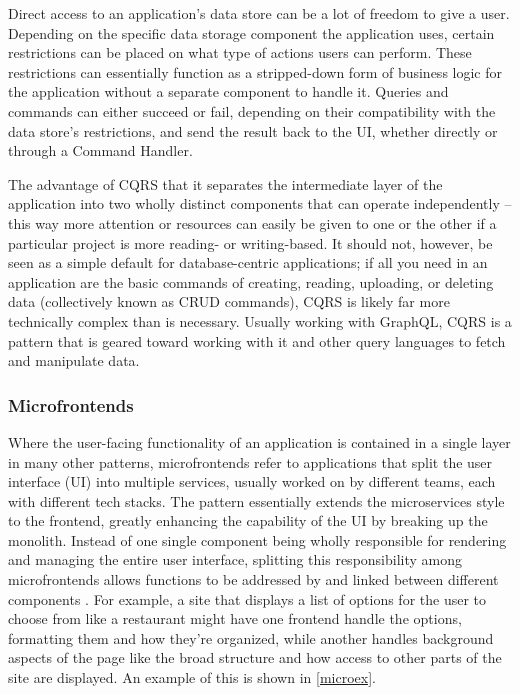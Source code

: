 Direct access to an application's data store can be a lot of freedom to give a user. Depending on the specific data storage component the application uses, certain restrictions can be placed on what type of actions users can perform. These restrictions can essentially function as a stripped-down form of business logic for the application without a separate component to handle it. Queries and commands can either succeed or fail, depending on their compatibility with the data store's restrictions, and send the result back to the UI, whether directly or through a Command Handler.

The advantage of CQRS that it separates the intermediate layer of the application into two wholly distinct components that can operate independently -- this way more attention or resources can easily be given to one or the other if a particular project is more reading- or writing-based. It should not, however, be seen as a simple default for database-centric applications; if all you need in an application are the basic commands of creating, reading, uploading, or deleting data (collectively known as CRUD commands), CQRS is likely far more technically complex than is necessary. Usually working with GraphQL, CQRS is a pattern that is geared toward working with it and other query languages to fetch and manipulate data.

\subsubsection{Microfrontends}

Where the user-facing functionality of an application is contained in a single layer in  many other  patterns, microfrontends refer to applications that split the user interface (UI) into multiple services, usually worked on by different teams, each with different tech stacks. The pattern essentially extends the microservices style to the frontend, greatly enhancing the capability of the UI by breaking up the monolith. Instead of one single component being wholly responsible for rendering and managing the entire user interface, splitting this responsibility among microfrontends allows functions to be addressed by and linked between different components \cite{jackson_micro_2019}. For example, a site that displays a list of options for the user to choose from like a restaurant might have one frontend handle the options, formatting them and how they're organized, while another handles background aspects of the page like the broad structure and how access to other parts of the site are displayed. An example of this is shown in \autoref{microex}. 

